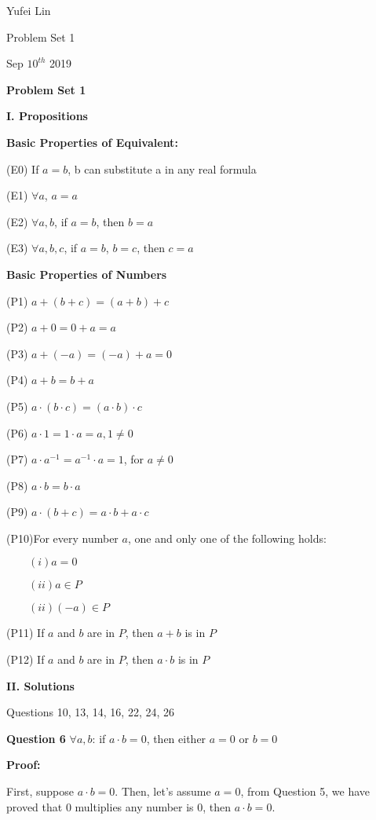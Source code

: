 \documentclass[a4paper,12pt]{report}
\begin{document}
\noindent
Yufei Lin

\noindent
Problem Set 1

\noindent
Sep \(10^{th}\) 2019

\begin{center}
\textbf{Problem Set 1}
\end{center}

\noindent
\textbf{I. Propositions}

\noindent
\textbf{Basic Properties of Equivalent:}

(E0) If $a=b$, b can substitute a in any real formula

(E1) $\forall a$, $a=a$

(E2) $\forall a,b$, if $a = b$, then $b =a$

(E3) $\forall a,b,c$, if $a=b$, $b=c$, then $c=a$

\noindent
\textbf{Basic Properties of Numbers}

(P1) $a+(b+c)=(a+b)+c$

(P2) $a+0=0+a=a$

(P3) $a+(-a)=(-a)+a=0$

(P4) $a+b=b+a$

(P5) $a \cdot{(b \cdot{c})}=(a \cdot{b}) \cdot{c}$

(P6) $a \cdot{1}=1\cdot{a}=a, 1\neq0$

(P7) $a\cdot{a^{-1}}=a^{-1}\cdot{a}=1$, for $a \neq 0$

(P8) $a\cdot{b} = b\cdot{a}$

(P9) $a \cdot{(b+c)} = a\cdot{b} +a\cdot{c}$

(P10)For every number $a$, one and only one of the following holds:

    $\qquad (i) a=0$
    
    $\qquad (ii) a\in P$
    
    $\qquad (ii) (-a)\in P$

(P11) If $a$ and $b$ are in $P$, then $a+b$ is in $P$

(P12) If $a$ and $b$ are in $P$, then $a\cdot{b}$ is in $P$

\noindent
\textbf{II. Solutions}

\noindent
Questions  10, 13, 14, 16, 22, 24, 26

\noindent
\textbf{Question 6} $\forall a,b$: if $a \cdot{b} = 0$, then either $a=0$ or $b=0$

\noindent
\textbf{Proof:}

\noindent
First, suppose $a\cdot{b}=0$. Then, let's assume $a=0$, from Question 5, we have proved that 0 multiplies any number is 0, then $a\cdot{b}=0$.
\end{document}
